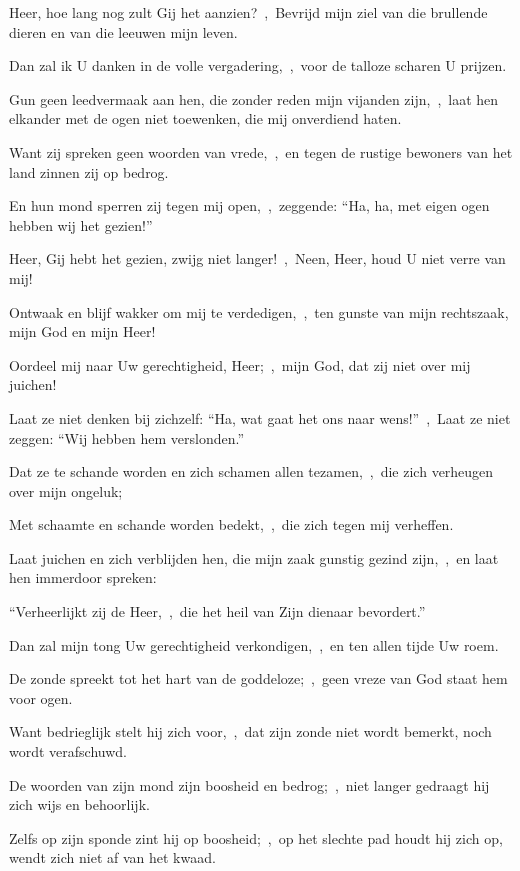 \documentclass[12pt,twoside,a5paper]{article}
\begin{document}
\begin{halfparskip}
  Heer, hoe lang nog zult Gij het aanzien?~\sep\ Bevrijd mijn ziel van die brullende dieren en van die leeuwen mijn leven.

  Dan zal ik U danken in de volle vergadering,~\sep\ voor de talloze scharen U prijzen.

  Gun geen leedvermaak aan hen, die zonder reden mijn vijanden zijn,~\sep\ laat hen elkander met de ogen niet toewenken, die mij onverdiend haten.

  Want zij spreken geen woorden van vrede,~\sep\ en tegen de rustige bewoners van het land zinnen zij op bedrog.

  En hun mond sperren zij tegen mij open,~\sep\ zeggende: ``Ha, ha, met eigen ogen hebben wij het gezien!''

  Heer, Gij hebt het gezien, zwijg niet langer!~\sep\ Neen, Heer, houd U niet verre van mij!

  Ontwaak en blijf wakker om mij te verdedigen,~\sep\ ten gunste van mijn rechtszaak, mijn God en mijn Heer!

  Oordeel mij naar Uw gerechtigheid, Heer;~\sep\ mijn God, dat zij niet over mij juichen!

  Laat ze niet denken bij zichzelf: ``Ha, wat gaat het ons naar wens!''~\sep\ Laat ze niet zeggen: ``Wij hebben hem verslonden.''

  Dat ze te schande worden en zich schamen allen tezamen,~\sep\ die zich verheugen over mijn ongeluk;

  Met schaamte en schande worden bedekt,~\sep\ die zich tegen mij verheffen.

  Laat juichen en zich verblijden hen, die mijn zaak gunstig gezind zijn,~\sep\ en laat hen immerdoor spreken:

  ``Verheerlijkt zij de Heer,~\sep\ die het heil van Zijn dienaar bevordert.''

  Dan zal mijn tong Uw gerechtigheid verkondigen,~\sep\ en ten allen tijde Uw roem.

   De zonde spreekt tot het hart van de goddeloze;~\sep\ geen vreze van God staat hem voor ogen.

  Want bedrieglijk stelt hij zich voor,~\sep\ dat zijn zonde niet wordt bemerkt, noch wordt verafschuwd.

  De woorden van zijn mond zijn boosheid en bedrog;~\sep\ niet langer gedraagt hij zich wijs en behoorlijk.

  Zelfs op zijn sponde zint hij op boosheid;~\sep\ op het slechte pad houdt hij zich op, wendt zich niet af van het kwaad.


\end{halfparskip}
\end{document}
